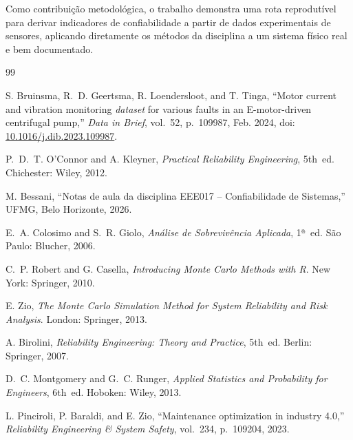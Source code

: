 \documentclass[conference]{IEEEtran}
\begin{document}
Como contribuição metodológica, o trabalho demonstra uma rota
reprodutível para derivar indicadores de confiabilidade a partir de
dados experimentais de sensores, aplicando diretamente os métodos
da disciplina a um sistema físico real e bem documentado.

\begin{thebibliography}{99}

S. Bruinsma, R.~D. Geertsma, R. Loendersloot, and T. Tinga,
``Motor current and vibration monitoring \textit{dataset} for various faults in
an E-motor-driven centrifugal pump,''
\textit{Data in Brief}, vol.~52, p.~109987, Feb. 2024,
doi: \url{10.1016/j.dib.2023.109987}.

P.~D.~T. O'Connor and A. Kleyner,
\textit{Practical Reliability Engineering}, 5th~ed.
Chichester: Wiley, 2012.

M. Bessani,
``Notas de aula da disciplina EEE017 -- Confiabilidade de Sistemas,''
UFMG, Belo Horizonte, 2026.

E.~A. Colosimo and S.~R. Giolo,
\textit{Análise de Sobrevivência Aplicada}, 1ª~ed.
São Paulo: Blucher, 2006.

C.~P. Robert and G. Casella,
\textit{Introducing Monte Carlo Methods with R}.
New York: Springer, 2010.

E. Zio,
\textit{The Monte Carlo Simulation Method for System Reliability and
Risk Analysis}.
London: Springer, 2013.

A. Birolini,
\textit{Reliability Engineering: Theory and Practice}, 5th~ed.
Berlin: Springer, 2007.

D.~C. Montgomery and G.~C. Runger,
\textit{Applied Statistics and Probability for Engineers}, 6th~ed.
Hoboken: Wiley, 2013.

L. Pinciroli, P. Baraldi, and E. Zio,
``Maintenance optimization in industry 4.0,''
\textit{Reliability Engineering \& System Safety}, vol.~234,
p.~109204, 2023.

\end{thebibliography}
\end{document}
